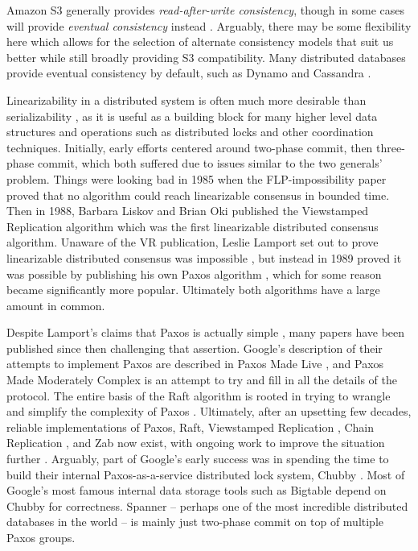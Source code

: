 \documentclass[11pt,fleqn,openany]{book}
\begin{document}
Amazon S3 generally provides {\em read-after-write consistency}, though in some
cases will provide {\em eventual consistency} instead \cite{s3-consistency}.
Arguably, there may be some flexibility here which allows for the selection
of alternate consistency models that suit us better while still broadly
providing S3 compatibility.
Many distributed databases provide eventual consistency by
default, such as Dynamo \cite{dynamo} and Cassandra \cite{cassandra}.

Linearizability in a distributed system is often much more desirable
than serializability \cite{Highly-Available-Seldom-Consistent}, as it is
useful as a building block for many higher level data structures and operations
such as distributed locks and other coordination techniques. Initially, early
efforts centered around two-phase commit, then three-phase commit, which both
suffered due to issues similar to the two generals' problem. Things were looking
bad in 1985 when the FLP-impossibility paper \cite{flp} proved that no algorithm
could reach linearizable consensus in bounded time. Then in 1988, Barbara Liskov
and Brian Oki published the Viewstamped Replication algorithm \cite{vr} which
was the first linearizable distributed consensus algorithm. Unaware of the VR
publication, Leslie Lamport set out to prove linearizable distributed consensus
was impossible \cite{paxos-note}, but instead in 1989 proved it was possible by
publishing his own Paxos algorithm \cite{paxos}, which for some reason became
significantly more popular. Ultimately both algorithms have a large amount in
common.

Despite Lamport's claims that Paxos is actually simple \cite{paxos-simple},
many papers have been published since then
challenging that assertion. Google's description of their attempts to implement
Paxos are described in Paxos Made Live \cite{paxos-live},
and Paxos Made Moderately
Complex \cite{paxos-complex} is an attempt to try and fill in all the details of
the protocol. The entire basis of the Raft algorithm is rooted in trying to
wrangle and simplify the complexity of Paxos \cite{raft}. Ultimately, after an
upsetting few decades, reliable implementations of Paxos, Raft, Viewstamped
Replication \cite{vrr}, Chain Replication \cite{chain-rep}, and Zab \cite{zab}
now exist, with ongoing work to improve the situation
further \cite{epaxos,paxos-flexible}. Arguably, part of Google's early success
was in spending the time to build their internal Paxos-as-a-service distributed
lock system, Chubby \cite{chubby}. Most of Google's most famous internal data
storage tools such as Bigtable \cite{bigtable} depend on Chubby for
correctness. Spanner \cite{spanner} -- perhaps one of the most incredible
distributed databases in the world -- is mainly just two-phase commit on top of
multiple Paxos groups.
\end{document}
